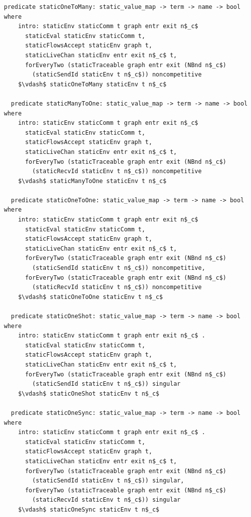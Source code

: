 \documentclass[letterpaper, 11pt]{extarticle}
\begin{document}
\begin{lstlisting}[language=logic, mathescape]
  predicate staticOneToMany: static_value_map -> term -> name -> bool where
    intro: staticEnv staticComm t graph entr exit n$_c$ 
      staticEval staticEnv staticComm t,
      staticFlowsAccept staticEnv graph t,
      staticLiveChan staticEnv entr exit n$_c$ t, 
      forEveryTwo (staticTraceable graph entr exit (NBnd n$_c$)
        (staticSendId staticEnv t n$_c$)) noncompetitive
    $\vdash$ staticOneToMany staticEnv t n$_c$

  predicate staticManyToOne: static_value_map -> term -> name -> bool where
    intro: staticEnv staticComm t graph entr exit n$_c$ 
      staticEval staticEnv staticComm t,
      staticFlowsAccept staticEnv graph t,
      staticLiveChan staticEnv entr exit n$_c$ t, 
      forEveryTwo (staticTraceable graph entr exit (NBnd n$_c$)
        (staticRecvId staticEnv t n$_c$)) noncompetitive
    $\vdash$ staticManyToOne staticEnv t n$_c$

  predicate staticOneToOne: static_value_map -> term -> name -> bool where
    intro: staticEnv staticComm t graph entr exit n$_c$ 
      staticEval staticEnv staticComm t,
      staticFlowsAccept staticEnv graph t,
      staticLiveChan staticEnv entr exit n$_c$ t, 
      forEveryTwo (staticTraceable graph entr exit (NBnd n$_c$) 
        (staticSendId staticEnv t n$_c$)) noncompetitive, 
      forEveryTwo (staticTraceable graph entr exit (NBnd n$_c$)
        (staticRecvId staticEnv t n$_c$)) noncompetitive
    $\vdash$ staticOneToOne staticEnv t n$_c$

  predicate staticOneShot: static_value_map -> term -> name -> bool where
    intro: staticEnv staticComm t graph entr exit n$_c$ . 
      staticEval staticEnv staticComm t,
      staticFlowsAccept staticEnv graph t,
      staticLiveChan staticEnv entr exit n$_c$ t, 
      forEveryTwo (staticTraceable graph entr exit (NBnd n$_c$)
        (staticSendId staticEnv t n$_c$)) singular
    $\vdash$ staticOneShot staticEnv t n$_c$

  predicate staticOneSync: static_value_map -> term -> name -> bool where
    intro: staticEnv staticComm t graph entr exit n$_c$ . 
      staticEval staticEnv staticComm t,
      staticFlowsAccept staticEnv graph t,
      staticLiveChan staticEnv entr exit n$_c$ t, 
      forEveryTwo (staticTraceable graph entr exit (NBnd n$_c$)
        (staticSendId staticEnv t n$_c$)) singular,
      forEveryTwo (staticTraceable graph entr exit (NBnd n$_c$)
        (staticRecvId staticEnv t n$_c$)) singular
    $\vdash$ staticOneSync staticEnv t n$_c$
  \end{lstlisting}
\end{document}
